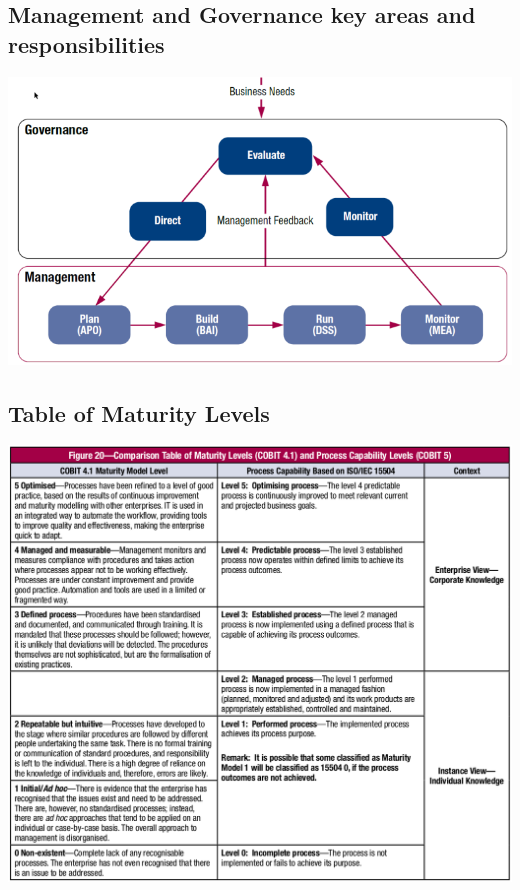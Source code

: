 \documentclass[8pt]{extarticle}
\begin{document}
\begin{multicols}{3}
\subsection{Management and Governance key areas and responsibilities}
\begin{center}
    \includegraphics[width=\columnwidth]{cobit-management-governance-key-areas.png}
\end{center}

\subsection{Table of Maturity Levels}
\begin{center}
    \includegraphics[width=\columnwidth]{cobit-maturity-level-comparison.png}
\end{center}



\end{multicols}
\end{document}

